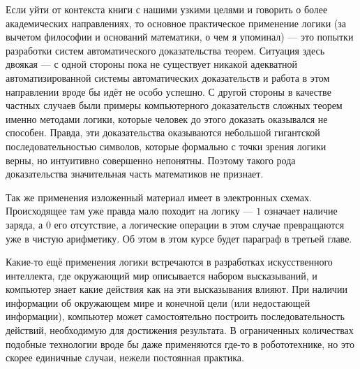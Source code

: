 Если уйти от контекста книги с нашими узкими целями и говорить о более академических направлениях, то основное практическое применение логики (за вычетом философии и оснований математики, о чем я упоминал) --- это попытки разработки систем автоматического доказательства теорем. Ситуация здесь двоякая --- с одной стороны пока не существует никакой адекватной автоматизированной системы автоматических доказательств и работа в этом направлении вроде бы идёт не особо успешно. С другой стороны в качестве частных случаев были примеры компьютерного доказательств сложных теорем именно методами логики, которые человек до этого доказать оказывался не способен. Правда, эти доказательства оказываются небольшой гигантской последовательностью символов, которые формально с точки зрения логики верны, но интуитивно совершенно непонятны. Поэтому такого рода доказательства значительная часть математиков не признает.

Так же применения изложенный материал имеет в электронных схемах. Происходящее там уже правда мало походит на логику --- $1$ означает наличие заряда, а $0$ его отсутствие, а логические операции в этом случае превращаются уже в чистую арифметику. Об этом в этом курсе будет параграф в третьей главе.

Какие-то ещё применения логики встречаются в разработках искусственного интеллекта, где окружающий мир описывается набором высказываний, и компьютер знает какие действия как на эти высказывания влияют. При наличии информации об окружающем мире и конечной цели (или недостающей информации), компьютер может самостоятельно построить последовательность действий, необходимую для достижения результата. В ограниченных количествах подобные технологии вроде бы даже применяются где-то в робототехнике, но это скорее единичные случаи, нежели постоянная практика.
